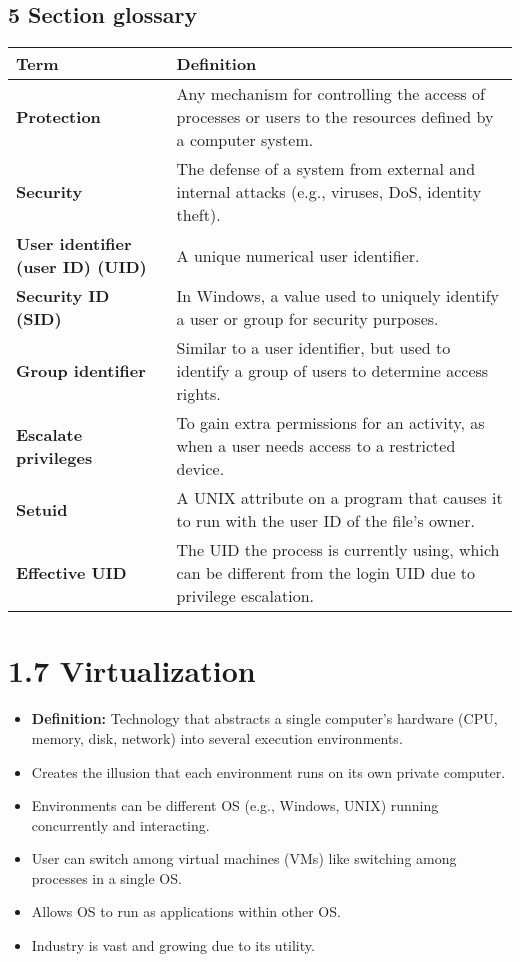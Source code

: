 \documentclass{article}
\begin{document}
\subsection*{5 Section glossary}
\centering
\begin{tabular}{>{\raggedright}p{} >{\raggedright\arraybackslash}p{}}
\toprule
\textbf{Term} & \textbf{Definition} \\
\midrule
\textbf{Protection} & Any mechanism for controlling the access of processes or users to the resources defined by a computer system. \\
\textbf{Security} & The defense of a system from external and internal attacks (e.g., viruses, DoS, identity theft). \\
\textbf{User identifier (user ID) (UID)} & A unique numerical user identifier. \\
\textbf{Security ID (SID)} & In Windows, a value used to uniquely identify a user or group for security purposes. \\
\textbf{Group identifier} & Similar to a user identifier, but used to identify a group of users to determine access rights. \\
\textbf{Escalate privileges} & To gain extra permissions for an activity, as when a user needs access to a restricted device. \\
\textbf{Setuid} & A UNIX attribute on a program that causes it to run with the user ID of the file's owner. \\
\textbf{Effective UID} & The UID the process is currently using, which can be different from the login UID due to privilege escalation. \\
\bottomrule
\end{tabular}
\vspace{\baselineskip}

\newpage
\section*{1.7 Virtualization}
\begin{itemize}
    \item \textbf{Definition:} Technology that abstracts a single computer's hardware (CPU, memory, disk, network) into several execution environments.
    \item Creates the illusion that each environment runs on its own private computer.
    \item Environments can be different OS (e.g., Windows, UNIX) running concurrently and interacting.
    \item User can switch among virtual machines (VMs) like switching among processes in a single OS.
    \item Allows OS to run as applications within other OS.
    \item Industry is vast and growing due to its utility.
\end{itemize}
\end{document}
